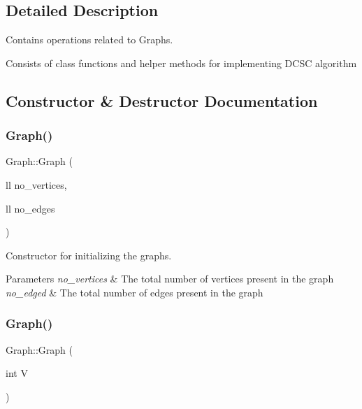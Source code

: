 \subsection{Detailed Description}
Contains operations related to Graphs. 

Consists of class functions and helper methods for implementing D\+C\+SC algorithm 

\subsection{Constructor \& Destructor Documentation}
\mbox{\label{classGraph_ac4a367e9d88770686d6d68b386542418}} 
\subsubsection{\texorpdfstring{Graph()}{Graph()}\hspace{0.1cm}{\footnotesize\ttfamily [1/2]}}
{\footnotesize\ttfamily Graph\+::\+Graph (\begin{DoxyParamCaption}\item[{ll}]{no\+\_\+vertices,  }\item[{ll}]{no\+\_\+edges }\end{DoxyParamCaption})\hspace{0.3cm}{\ttfamily [inline]}}



Constructor for initializing the graphs. 


\begin{DoxyParams}{Parameters}
{\em no\+\_\+vertices} & The total number of vertices present in the graph \\
\hline
{\em no\+\_\+edged} & The total number of edges present in the graph \\
\hline
\end{DoxyParams}
\mbox{\label{classGraph_af3ff6b295df8bf3bee0bafd7c7d56915}} 
\subsubsection{\texorpdfstring{Graph()}{Graph()}\hspace{0.1cm}{\footnotesize\ttfamily [2/2]}}
{\footnotesize\ttfamily Graph\+::\+Graph (\begin{DoxyParamCaption}\item[{int}]{V }\end{DoxyParamCaption})}



